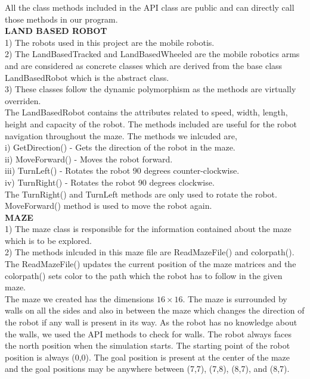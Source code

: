 \documentclass[11pt]{article}
\begin{document}
All the class methods included in the API class are public and can directly call those methods in our program.\\

\textbf{LAND BASED ROBOT}\\

1) The robots used in this project are the mobile robotis.\\
2) The LandBasedTracked and LandBasedWheeled are the mobile robotics arms and are considered as concrete classes which are derived from the base class LandBasedRobot which is the abstract class.\\
3) These classes follow the dynamic polymorphism as the methods are virtually overriden.\\

The LandBasedRobot contains the attributes related to speed, width, length, height and capacity of the robot. The methods included are useful for the robot navigation throughout the maze. The methods we inlcuded are,\\

i) GetDirection() - Gets the direction of the robot in the maze.\\
ii) MoveForward() - Moves the robot forward.\\
iii) TurnLeft() - Rotates the robot 90 degrees counter-clockwise.\\
iv) TurnRight() - Rotates the robot 90 degrees clockwise.\\

The TurnRight() and TurnLeft methods are only used to rotate the robot. MoveForward() method is used to move the robot again.\\

\textbf{MAZE}\\

1) The maze class is responsible for the information contained about the maze which is to be explored.\\
2) The methods inlcuded in this maze file are ReadMazeFile() and colorpath(). The ReadMazeFile() updates the current position of the maze matrices and the colorpath() sets color to the path which the robot has to follow in the given maze.\\

The maze we created has the dimensions $16\times16$. The maze is surrounded by walls on all the sides and also in between the maze which changes the direction of the robot if any wall is present in its way. As the robot has no knowledge about the walls, we used the API methods to check for walls. The robot always faces the north position when the simulation starts. The starting point of the robot position is always (0,0). The goal position is present at the center of the maze and the goal positions may be anywhere between (7,7), (7,8), (8,7), and (8,7).
\end{document}
